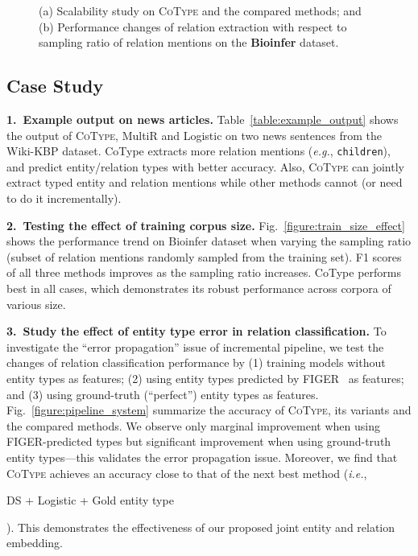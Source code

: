 \documentclass[letterpaper]{sig-alternate-2013}
\def\ie{{\sl i.e.}}
\def\eg{{\sl e.g.}}
\begin{document}
\begin{figure}[h]
\centering
{}
\vspace{-0.2cm}
\caption{(a) Scalability study on \textsc{CoType} and the compared methods; and (b) Performance changes of relation extraction with respect to sampling ratio of relation mentions on the \textbf{Bioinfer} dataset.}
\end{figure}


\subsection{Case Study}
\noindent
\textsf{\small\textbf{1.~Example output on news articles.}}
Table~\ref{table:example_output} shows the output of \textsc{\small CoType}, MultiR and Logistic on two news sentences from the Wiki-KBP dataset. CoType extracts more relation mentions (\eg, \texttt{\small children}), and predict entity/relation types with better accuracy. Also, \textsc{\small CoType} can jointly extract typed entity and relation mentions while other methods cannot (or need to do it incrementally).


\smallskip\noindent
\textsf{\small\textbf{2.~Testing the effect of training corpus size.}}
Fig.~\ref{figure:train_size_effect} shows the performance trend on Bioinfer dataset when varying the sampling ratio (subset of relation mentions randomly sampled from the training set). F1 scores of all three methods improves as the sampling ratio increases. CoType performs best in all cases, which demonstrates its robust performance across corpora of various size.

\smallskip\noindent
\textsf{\small\textbf{3.~Study the effect of entity type error in relation classification.}}
To investigate the ``error propagation'' issue of incremental pipeline, we test the changes of relation classification performance by (1) training models without entity types as features; (2) using entity types predicted by FIGER~\cite{ling2012fine} as features; and (3) using ground-truth (``perfect'') entity types as features. 
Fig.~\ref{figure:pipeline_system} summarize the accuracy of \textsc{\small CoType}, its variants and the compared methods.
We observe only marginal improvement when using FIGER-predicted types but significant improvement when using ground-truth entity types---this validates the error propagation issue. Moreover, we find that \textsc{\small CoType} achieves an accuracy close to that of the next best method (\ie, \begin{small}
DS + Logistic + Gold entity type\end{small}). This demonstrates the effectiveness of our proposed joint entity and relation embedding. 
\end{document}
